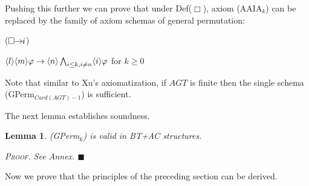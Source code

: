 \documentclass{article}
\newtheorem{lemma}{Lemma}
\newenvironment{pf}{\em \medskip\noindent \textsc{Proof.}}
{\hspace*{\fill}\nolinebreak[2]\hspace*{\fill}$\blacksquare$\medskip}
\renewcommand{\phi}{\varphi}
\newcommand{\card}[1]{\mathit{Card}(#1)}           \newcommand{\ext}[1]{|#1|}
\newcommand{\InclBox}[1]{$\Box \!\! \imp \!\! #1$}
\newcommand{\agtset}{\ensuremath{\mathit{AGT}}}
\begin{document}
Pushing this further we can prove that under Def($\Box$), axiom (AAIA$_k$) can be
replaced by the family of axiom schemas of general permutation:
\begin{itemlist}{(\InclBox{i})}
\item[(GPerm$_k$)]
$\poscstit{l}\poscstit{m}\phi \imp
\poscstit{n}\bigwedge_{i\leq k, i \not = n} \poscstit{i}\phi$    \hfill for $k \geq 0$
\end{itemlist}
Note that similar to Xu's axiomatization, if $\agtset$ is finite then the single
schema (GPerm$_{\card{\agtset}-1}$) is sufficient.

The next lemma establishes soundness.

\begin{lemma}\label{lem:validGperm}
(GPerm$_k$) is valid in BT+AC structures.

\begin{pf}
See Annex.
\end{pf}
\end{lemma}

Now we prove that the principles of the preceding section can be derived.
\end{document}
